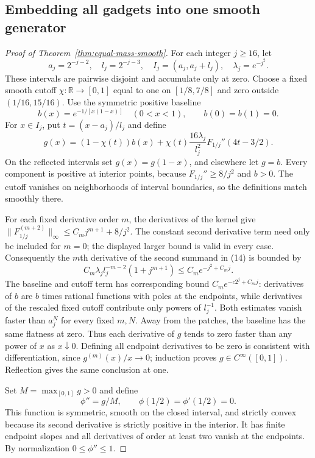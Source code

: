 \subsection{Embedding all gadgets into one smooth generator}

\begin{proof}[Proof of Theorem~\ref{thm:equal-mass-smooth}]
For each integer $j\geq16$, let
\[
 a_j=2^{-j-2},\quad l_j=2^{-j-3},\quad
 I_j=(a_j,a_j+l_j),\quad\lambda_j=e^{-j^2}.
\]
These intervals are pairwise disjoint and accumulate only at zero.
Choose a fixed smooth cutoff $\chi:\mathbb R\to[0,1]$ equal to one
on $[1/8,7/8]$ and zero outside $(1/16,15/16)$.
Use the symmetric positive baseline
\[
 b(x)=e^{-1/[x(1-x)]}\quad(0<x<1),\qquad b(0)=b(1)=0.
\]
For $x\in I_j$, put $t=(x-a_j)/l_j$ and define
\[
 g(x)=(1-\chi(t))b(x)
    +\chi(t)\frac{16\lambda_j}{l_j^2}
       F_{1/j}''(4t-3/2).
 \tag{14}\label{eq:equal-mass-gluing}
\]
On the reflected intervals set $g(x)=g(1-x)$, and elsewhere let $g=b$.
Every component is positive at interior points, because
$F_{1/j}''\geq8/j^2$ and $b>0$.  The cutoff vanishes on neighborhoods
of interval boundaries, so the definitions match smoothly there.

For each fixed derivative order $m$, the derivatives of the kernel
give $\|F_{1/j}^{(m+2)}\|_\infty\leq C_m j^{m+1}+8/j^2$.
The constant second derivative term need only be included for $m=0$;
the displayed larger bound is valid in every case.  Consequently
the $m$th derivative of the second summand in (14) is bounded by
\[
 C_m\lambda_j l_j^{-m-2}(1+j^{m+1})
 \leq C_m e^{-j^2+C_mj}.
 \tag{15}\label{eq:equal-target-flatness}
\]
The baseline and cutoff term has corresponding bound
$C_me^{-c2^j+C_mj}$: derivatives of $b$ are $b$ times rational
functions with poles at the endpoints, while derivatives of the
rescaled fixed cutoff contribute only powers of $l_j^{-1}$.
Both estimates vanish faster than $a_j^N$ for every fixed $m,N$.
Away from the patches, the baseline has the same flatness at zero.
Thus each derivative of $g$ tends to zero faster than any power of
$x$ as $x\downarrow0$.  Defining all endpoint derivatives to be zero
is consistent with differentiation, since $g^{(m)}(x)/x\to0$;
induction proves $g\in C^\infty([0,1])$.  Reflection gives the same
conclusion at one.

Set $M=\max_{[0,1]}g>0$ and define
\[
 \phi''=g/M,\qquad\phi(1/2)=\phi'(1/2)=0.
\]
This function is symmetric, smooth on the closed interval, and strictly
convex because its second derivative is strictly positive in the
interior.  It has finite endpoint slopes and all derivatives of order
at least two vanish at the endpoints.  By normalization
$0\leq\phi''\leq1$.


\end{proof}
